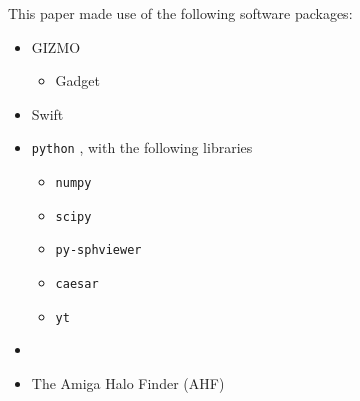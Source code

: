 This paper made use of the following software packages:
\begin{itemize}
    \item GIZMO \citep{Hopkins2017}
        \begin{itemize}
            \item Gadget \citep{Springel2005b}
        \end{itemize}
    \item {\sc Swift} \citep{Schaller2016}
    \item {\tt python} \citep{Rossum1995}, with the following libraries
    \begin{itemize}
    	\item {\tt numpy} \citep{Numpy2006}
    	\item {\tt scipy} \citep{Scipy2001}
    	\item {\tt py-sphviewer} \citep{Benitez-Llambay2015}
    	\item {\tt caesar} \citep{Thompson2018}
    	\item {\tt yt} \citep{Turk2011}
    \end{itemize}
    \item \velociraptor{} \citep{Elahi2019}
    \item The Amiga Halo Finder (AHF) \citep{Gill2004, Knollmann2009}
\end{itemize}


